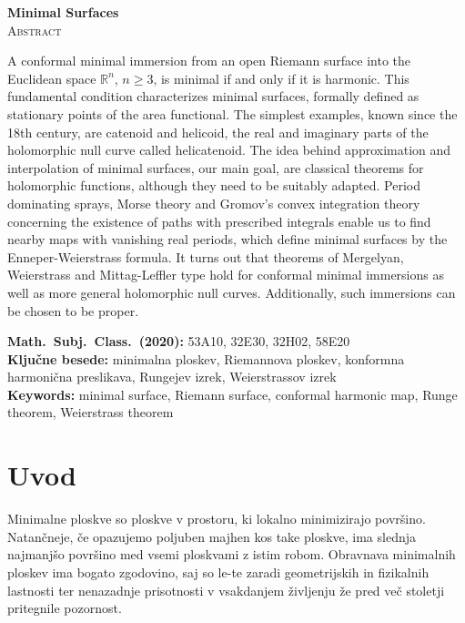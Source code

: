 \documentclass[12pt,a4paper,twoside]{article}
\newcommand{\kljucnebesede}{minimalna ploskev\sep Riemannova ploskev\sep konformna harmonična preslikava\sep Rungejev izrek\sep Weierstrassov izrek} %
\newcommand{\keywords}{minimal surface\sep Riemann surface\sep conformal harmonic map\sep Runge theorem\sep Weierstrass theorem} %
\newcommand{\sep}{, }  %
\theoremstyle{definition} %
\theoremstyle{plain} %
\numberwithin{equation}{section}  %
\newcommand{\R}{\mathbb R}
\begin{document}
\vfill
\begin{center}
\textbf{Minimal Surfaces} \\[3mm] %
\textsc{Abstract}\\[2mm]
\end{center}
A conformal minimal immersion from an open Riemann surface into the Euclidean space $\R^{n}$, $n \geq 3$, is minimal if and only if it is harmonic. This fundamental condition characterizes minimal surfaces, formally defined as stationary points of the area functional. The simplest examples, known since the 18th century, are catenoid and helicoid, the real and imaginary parts of the holomorphic null curve called helicatenoid. The idea behind approximation and interpolation of minimal surfaces, our main goal, are classical theorems for holomorphic functions, although they need to be suitably adapted. Period dominating sprays, Morse theory and Gromov’s convex integration theory concerning the existence of paths with prescribed integrals enable us to find nearby maps with vanishing real periods, which define minimal surfaces by the Enneper-Weierstrass formula. It turns out that theorems of Mergelyan, Weierstrass and Mittag-Leffler type hold for conformal minimal immersions as well as more general holomorphic null curves. Additionally, such immersions can be chosen to be proper. 

\vfill\noindent
\textbf{Math.~Subj.~Class.~(2020):} 53A10, 32E30, 32H02, 58E20 \\[1mm]
\textbf{Ključne besede:} \kljucnebesede \\[1mm]
\textbf{Keywords:} \keywords

\cleardoublepage

\setcounter{page}{1}    %

\section{Uvod}

Minimalne ploskve so ploskve v prostoru, ki lokalno minimizirajo površino. Natančneje, če opazujemo poljuben majhen kos take ploskve, ima slednja najmanjšo površino med vsemi ploskvami z istim robom.
Obravnava minimalnih ploskev ima bogato zgodovino, saj so le-te zaradi geometrijskih in fizikalnih lastnosti ter nenazadnje prisotnosti v vsakdanjem življenju že pred več stoletji pritegnile pozornost.
\end{document}
